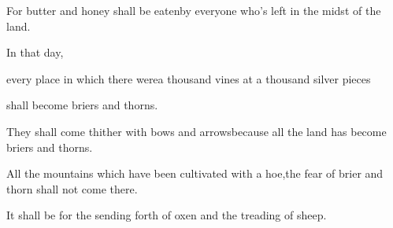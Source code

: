 \begin{inparaenum}
  \pb{}For butter and honey shall be eaten\pa{}by everyone who's left in the midst of the land.%

  \pa{} In that day,%

  \pb{}every place in which there were\pa{}a thousand vines at a thousand silver pieces%

  \pb{}shall become briers and thorns.%

  \pa{} They shall come thither with bows and arrows\pa{}because all the land has become briers and thorns.%

  \pb{} All the mountains which have been cultivated with a hoe,\pa{}the fear of brier and thorn shall not come there.%

  \pb{}It shall be for the sending forth of oxen and the treading of sheep.%
\end{inparaenum}
